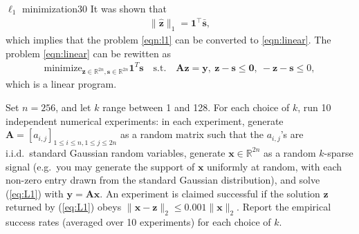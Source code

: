 \documentclass{article}
\begin{document}
\begin{problem}{$\ell_1$ minimization}{30}
{It was shown that 
	\begin{align*}
		\|\hat{\bm{z}}\|_1=\bm{1}^{\top}\bm{\bar{\bm{s}}},
	\end{align*}
which implies that the problem \eqref{eqn:l1} can be converted to \eqref{eqn:linear}. 
The problem \eqref{eqn:linear} can be rewitten as
	\begin{align*}
	\mathrm{minimize}_{\bm{z}\in\mathbb{R}^{2n},\bm{s}\in\mathbb{R}^{2n}} \bm{1}^T\bm{s} \quad\mathrm{s.t.}\quad \bm{A}\bm{z}=\bm{y}, ~\bm{z}-\bm{s}\leq\bm{0},~-\bm{z}-\bm{s}\leq 0	,
	\end{align*}
which is a linear program.
}




	Set $n=256$, and let $k$ range between 1 and 128.  For each choice of $k$, run 10 independent numerical experiments: in each experiment, generate $\bm{A} = [a_{i,j}]_{1\leq i\leq n, 1\leq j\leq 2n}$ as a random matrix such that the $a_{i,j}$'s are i.i.d.~standard Gaussian random variables,  generate $\bm{x} \in \mathbb{R}^{2n}$ as a random $k$-sparse signal (e.g.~you may generate the support of $\bm{x}$ uniformly at random, with each non-zero entry drawn from the standard Gaussian distribution),  and solve (\ref{eq:L1}) with $\bm{y} = \bm{A}\bm{x}$.  An experiment is claimed successful if the solution $\bm{z}$ returned by (\ref{eq:L1}) obeys $\| \bm{x} - \bm{z} \|_2 \leq 0.001 \| \bm{x} \|_2$. 
Report the empirical success rates (averaged over 10 experiments) for each choice of $k$. 
\end{problem}
\end{document}
